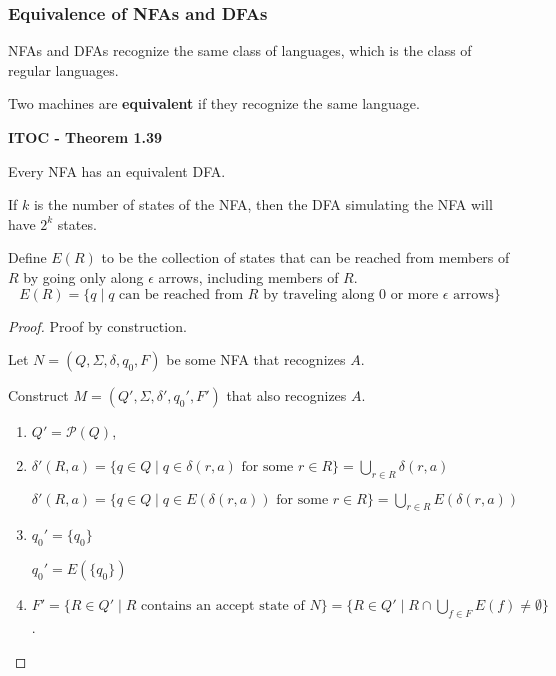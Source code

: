 \subsubsection{Equivalence of NFAs and DFAs}

NFAs and DFAs recognize the same class of languages, which is the class of regular languages.

Two machines are \textbf{equivalent} if they recognize the same language.

\begin{shaded}
\textbf{ITOC - Theorem 1.39}

\medskip
Every NFA has an equivalent DFA.
\end{shaded}

If $k$ is the number of states of the NFA, then the DFA simulating the NFA will have $2^k$ states.

{\color{blue} Define $E(R)$ to be the collection of states that can be reached from members of $R$ by going only along $\epsilon$ arrows, including members of $R$.
\[
E(R) = \{q \mid q \text{ can be reached from $R$ by traveling along 0 or more $\epsilon$ arrows}\}
\]}
\begin{mdframed}
\begin{proof}
Proof by construction.

Let $N = (Q, \Sigma, \delta, q_0, F)$ be some NFA that recognizes $A$. 

Construct $M = (Q', \Sigma, \delta', q_0', F')$ that also recognizes $A$.

\begin{enumerate}
\item $Q' = \mathcal{P}(Q)$,

\item $\delta'(R, a) = \{q \in Q \mid q \in \delta(r, a) \text{ for some } r \in R \}
= \bigcup_{r \in R} \delta(r, a)$

$\delta'(R, a) = \{q \in Q \mid q \in E(\delta(r, a)) \text{ for some } r \in R \}
=\bigcup_{r \in R} E(\delta(r, a))$

\item $q_0' = \{q_0\}$ 

$q_0' =  E(\{q_0 \})$

\item $F' = \{R \in Q' \mid R \text{ contains an accept state of } N\} = \{R \in Q' \mid R \cap \bigcup_{f\in F} E(f) \neq \emptyset \}$.
\end{enumerate}
\end{proof}
\end{mdframed}

